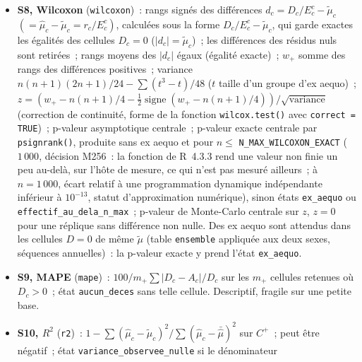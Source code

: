 \documentclass[a4paper,11pt]{article}
\newcommand{\code}[1]{\texttt{\small #1}}
\begin{document}
{\begin{itemize}[leftmargin=*, itemsep=2pt]
    \code{actuary}, commit \code{e9cbf53})~; p-valeur de Monte-Carlo, queue
    inférieure sur $R$, statistique non conditionnelle à $(n_{+}, n_{-})$,
    donc sensible au déséquilibre des signes comme à leur regroupement. Le
    sens inférieur répond à l'écart visé~: une table qui s'écarte des
    observations sur une plage d'âges y regroupe les résidus d'un même
    signe et réduit le nombre de suites~; la note associe d'ailleurs un bon
    ajustement à «~un grand nombre de \emph{runs}~» (p.~3/29).
  \item \textbf{S8, Wilcoxon} (\code{wilcoxon})~: rangs signés des
    différences $d_c = D_c/E^c_c - \tilde\mu_c$ $(= \hat\mu_c - \tilde\mu_c
    = r_c / E^c_c)$, calculées sous la forme $D_c/E^c_c - \tilde\mu_c$, qui
    garde exactes les égalités des cellules $D_c = 0$ ($|d_c| =
    \tilde\mu_c$)~; les différences des résidus nuls sont retirées~; rangs
    moyens des $|d_c|$ égaux (égalité exacte)~; $w_{+}$ somme des rangs des
    différences positives~; variance $n(n+1)(2n+1)/24 - \sum(t^3 - t)/48$
    ($t$ taille d'un groupe d'ex aequo)~; $z = (w_{+} - n(n+1)/4 -
    \tfrac12\operatorname{signe}(w_{+} - n(n+1)/4))/\sqrt{\text{variance}}$
    (correction de continuité, forme de la fonction \code{wilcox.test()}
    avec \code{correct = TRUE})~; p-valeur asymptotique centrale~; p-valeur
    exacte centrale par \code{psignrank()}, produite sans ex aequo et pour
    $n \le$ \code{N\_MAX\_WILCOXON\_EXACT} ($1\,000$, décision M256~: la
    fonction de R~4.3.3 rend une valeur non finie un peu au-delà, sur l'hôte
    de mesure, ce qui n'est pas mesuré ailleurs~; à $n = 1\,000$, écart
    relatif à une programmation dynamique indépendante inférieur à
    $10^{-13}$, statut d'approximation numérique),
    sinon états \code{ex\_aequo} ou \code{effectif\_au\_dela\_n\_max}~;
    p-valeur de Monte-Carlo centrale sur $z$, $z = 0$ pour une réplique
    sans différence non nulle. Des ex aequo sont attendus dans les cellules
    $D = 0$ de même $\tilde\mu$ (table \code{ensemble} appliquée aux deux
    sexes, séquences annuelles)~: la p-valeur exacte y prend l'état
    \code{ex\_aequo}.
  \item \textbf{S9, MAPE} (\code{mape})~: $100/m_{+} \sum |D_c - A_c|/D_c$
    sur les $m_{+}$ cellules retenues où $D_c > 0$~; état
    \code{aucun\_deces} sans telle cellule. Descriptif, fragile sur une
    petite base.
  \item \textbf{S10, $R^2$} (\code{r2})~: $1 - \sum(\hat\mu_c -
    \tilde\mu_c)^2 / \sum(\hat\mu_c - \bar{\hat\mu})^2$ sur $C^{+}$~; peut
    être négatif~; état \code{variance\_observee\_nulle} si le dénominateur

\end{itemize}}
\end{document}
